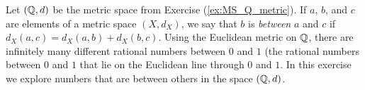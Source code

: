 {\begin{comment}
\item Since $0 = \frac{0}{1}$ and $1 = \frac{1}{1}$ we have that $d(0,1) = 1$. So if $b = \frac{u}{v}$ is between $0$ and $1$, then 
\[1 = d(0,b) + d(b,1).\]
Now $d(0,b) = \max\{|u|, |v-1|\}$ and $d(1,b) = \max\{|u-1|, |v-1|\}$. We consider the cases. 
\begin{itemize}
\item Suppose $d(0,b) = |u|$ and $d(a,b) = |u-1|$. Then 
\[1 = |u| + |u-1|.\]
Since $u$ is an integer, the cases are $|u| = 0$ and $|u-1| = 1$, or $|u|=1$ and $|u-1| = 0$. When $u=0$, $b=0$.  When $|u-1|=0$ we have $u = 1$. The fact that  $|u-1| \geq |v-1|$ implies that $0 \geq |v-1|$ and $v = 1$. In this case $b = 1$. 

\item Suppose $d(0,b) = |u|$ and $d(a,b) = |v-1|$. Then 
\[1 = |u| + |v-1|.\]
The cases are $|u|=0$ and $|v-1| = 1$, or $|u| = 1$ and $|v-1| = 0$.  When $u=0$, $b=0$. When $|v-1| = 0$ we must have $v = 1$. The fact that $0 = |v-1| \geq |u-1|$ implies that $u=1$. 

\item Suppose $d(0,b) = |v-1|$ and $d(a,b) = |u-1|$. Then 
\[1 = |v-1| + |u-1|.\]
The cases are $|u-1|=0$ and $|v-1| = 1$, or $|u-1| = 1$ and $|v-1| = 0$.  When $|u-1|=0$ we have $u=1$. The fact that $0 = |u-1| \geq |v-1|$ tells us that $v=1$. So $b=1$. When $|v-1| = 0$, then $v=1$. The fact that  $0 = |v-1| \geq |u|$ implies that $u=0$. This makes $b=0$. 

\item Suppose $d(0,b) = |v-1|$ and $d(a,b) = |v-1|$. Then 
\[1 = |v-1| + |v-1|.\]
But this is impossible when $v$ is an integer. 

\end{itemize}
We conclude that the only rational numbers in $(\Q,d)$ between $0$ and $1$ are $b = 0$ and $b=1$. 

	\ea
	

\end{comment}


\item Let $(\mathbb{Q},d)$ be the metric space from Exercise (\ref{ex:MS_Q_metric}). If $a$, $b$, and $c$ are elements of a metric space $(X, d_X)$, we say that $b$ is \emph{between} $a$ and $c$ if $d_X(a,c) = d_X(a,b) + d_X(b,c)$. Using the Euclidean metric on $\mathbb{Q}$, there are infinitely many different rational numbers between $0$ and $1$ (the rational numbers between $0$ and $1$ that lie on the Euclidean line through $0$ and $1$. In this exercise we explore numbers that are between others in the space $(\mathbb{Q},d)$. 

}
